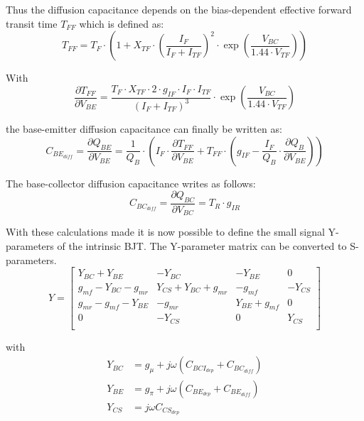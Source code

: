 \documentclass[10pt]{report}
\begin{document}
Thus the diffusion capacitance depends on the bias-dependent effective
forward transit time $T_{FF}$ which is defined as:
\begin{equation}
T_{FF} = T_F \cdot\left(1 + X_{TF} \cdot \left(\dfrac{I_F}{I_F + I_{TF}}\right)^2 \cdot \exp{\left(\dfrac{V_{BC}}{1.44\cdot V_{TF}}\right)}\right)
\end{equation}

With
\begin{equation}
\frac{\partial T_{FF}}{\partial V_{BE}} = \dfrac{T_F\cdot X_{TF}\cdot 2\cdot g_{IF}\cdot I_F\cdot I_{TF}}{\left(I_F + I_{TF}\right)^3}\cdot \exp{\left(\dfrac{V_{BC}}{1.44\cdot V_{TF}}\right)}
\end{equation}

the base-emitter diffusion capacitance can finally be written as:
\begin{equation}
C_{BE_{diff}} = \dfrac{\partial Q_{BE}}{\partial V_{BE}} = \dfrac{1}{Q_B}\cdot \left(I_F\cdot \dfrac{\partial T_{FF}}{\partial V_{BE}} + T_{FF}\cdot\left(g_{IF} - \dfrac{I_F}{Q_B}\cdot \dfrac{\partial Q_B}{\partial V_{BE}}\right)\right)
\end{equation}

The base-collector diffusion capacitance writes as follows:
\begin{equation}
C_{BC_{diff}} = \dfrac{\partial Q_{BC}}{\partial V_{BC}} = T_{R} \cdot g_{IR}
\end{equation}

With these calculations made it is now possible to define the small
signal Y-parameters of the intrinsic BJT.  The Y-parameter matrix can
be converted to S-parameters.
\begin{equation}
Y =
\begin{bmatrix}
Y_{BC} + Y_{BE} & -Y_{BC} & -Y_{BE} & 0\\
g_{mf} - Y_{BC} - g_{mr} & Y_{CS} + Y_{BC} + g_{mr}& - g_{mf} & -Y_{CS}\\
g_{mr} - g_{mf} - Y_{BE} & -g_{mr} & Y_{BE} + g_{mf} & 0\\
0 & -Y_{CS} & 0 & Y_{CS}\\
\end{bmatrix}
\end{equation}

with
\begin{align}
Y_{BC} &= g_{\mu} + j\omega \left(C_{BCI_{dep}} + C_{BC_{diff}}\right)\\
Y_{BE} &= g_{\pi} + j\omega \left(C_{BE_{dep}} + C_{BE_{diff}}\right)\\
Y_{CS} &= j\omega C_{CS_{dep}}
\end{align}
\end{document}
